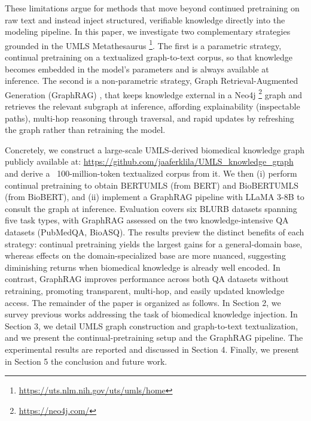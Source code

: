 \documentclass[10pt, a4paper]{article}
\begin{document}
These limitations argue for methods that move beyond continued pretraining on raw text and instead inject structured, verifiable knowledge directly into the modeling pipeline. In this paper, we investigate two complementary strategies grounded in the UMLS Metathesaurus \footnote{\url{https://uts.nlm.nih.gov/uts/umls/home}}. The first is a parametric strategy, continual pretraining on a textualized graph-to-text corpus, so that knowledge becomes embedded in the model’s parameters and is always available at inference. The second is a non-parametric strategy, Graph Retrieval-Augmented Generation (GraphRAG) \cite{han2024retrieval}, that keeps knowledge external in a Neo4j \footnote{\url{https://neo4j.com/}} graph and retrieves the relevant subgraph at inference, affording explainability (inspectable paths), multi-hop reasoning through traversal, and rapid updates by refreshing the graph rather than retraining the model.

Concretely, we construct a large-scale UMLS-derived biomedical knowledge graph  publicly available at: \url{https://github.com/jaaferklila/UMLS_knowledge_graph}
and derive a ~100-million-token textualized corpus from it. We then (i) perform continual pretraining to obtain BERTUMLS (from BERT) and BioBERTUMLS (from BioBERT), and (ii) implement a GraphRAG pipeline with LLaMA 3-8B to consult the graph at inference. Evaluation covers six BLURB datasets \cite{gu2021domain}  spanning five task types, with GraphRAG assessed on the two knowledge-intensive QA datasets (PubMedQA, BioASQ). The results preview the distinct benefits of each strategy: continual pretraining yields the largest gains for a general-domain base, whereas effects on the domain-specialized base are more nuanced, suggesting diminishing returns when biomedical knowledge is already well encoded. In contrast, GraphRAG improves performance across both QA datasets without retraining, promoting transparent, multi-hop, and easily updated knowledge access.
The remainder of the paper is organized as follows. In Section 2, we survey previous works addressing the task of biomedical knowledge injection. In Section 3, we detail UMLS graph construction and graph-to-text textualization, and we present the continual-pretraining setup and the GraphRAG pipeline. The experimental results are reported and discussed in Section 4. Finally, we present in Section 5 the conclusion and future work.
\end{document}
